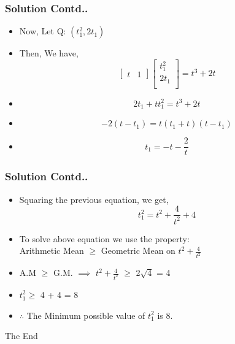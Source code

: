 \documentclass[12pt]{beamer}
\begin{document}

\begin{frame}
\frametitle{Solution Contd..}
\begin{itemize}
\item<1-5> Now, Let Q: $( t_1^2, 2t_1 )$
\item<2-5> Then, We have,
\[
\begin{bmatrix}
    t & 1  
\end{bmatrix}
\begin{bmatrix}
    t_1^2\\
    2t_1\\  
\end{bmatrix} = 
t^3 + 2t
\]
\item<3-5> \[
2t_1 + tt_1^2 = t^3 + 2t 
\]
\item<4-5>
\[
-2(t - t_1) = t(t_1 + t)(t - t_1)
\]
\item<5>
\[
t_1 = -t - \frac{2}{t}
\]
\end{itemize}
\end{frame}



\begin{frame}
\frametitle{Solution Contd..}
\begin{itemize}
\item<1-5>
Squaring the previous equation, we get,
\[
t_1^2 = t^2 + \frac{4}{t^2} + 4
\]
\item<2-5> To solve above equation we use the property:\\
Arithmetic Mean $\geq$ Geometric Mean on $t^2 + \frac{4}{t^2}$
\item<3-5> A.M $\geq$ G.M. $\implies$ $t^2 + \frac{4}{t^2}$ $\geq$ 2$\sqrt{4}$ = 4
\item<4-5> $t_1^2 \geq$ 4 + 4 = 8
\item<5> $\therefore$ The Minimum possible value of $t_1^2$ is 8.
\end{itemize}
\end{frame}


\begin{frame}
\Huge{\centerline{The End}}
\end{frame}

\end{document}
